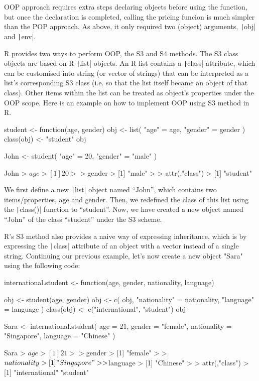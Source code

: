 OOP approach requires extra steps declaring objects before using the function, but once the declaration is completed, calling the pricing funcion is much simpler than the POP approach. As above, it only required two (object) arguments, \texttt|obj| and \texttt|env|.

R provides two ways to perform OOP, the S3 and S4 methods. The S3 class objects are based on R \texttt|list| objects. An R list contains a \texttt|class| attribute, which can be customised into string (or vector of strings) that can be interpreted as a list's corresponding S3 class (i.e. so that the list itself became an object of that class). Other items within the list can be treated as object's properties under the OOP scope. Here is an example on how to implement OOP using S3 method in R.

\begin{Rminted}
student <- function(age, gender) {
    obj <- list(
        "age" = age,
        "gender" = gender
    )
    class(obj) <- "student"
    obj
}

John <- student(
    "age" = 20,
    "gender" = "male"
)

John
> $age
> [1] 20
> 
> $gender
> [1] "male"
> 
> attr(,"class")
> [1] "student"
\end{Rminted}

We first define a new \texttt|list| object named ``John'', which contains two items/properties, age and gender. Then, we redefined the class of this list using the \texttt|class()| function to ``student''. Now, we have created a new object named ``John'' of the class ``student'' under the S3 scheme.

R's S3 method also provides a naive way of expressing inheritance, which is by expressing the \texttt|class| attribute of an object with a vector instead of a single string. Continuing our previous example, let's now create a new object "Sara" using the following code:

\begin{Rminted}
international.student <- function(age, gender, nationality, language) {
    
    obj <- student(age, gender)
    obj <- c(
        obj,
        "nationality" = nationality,
        "language" = language
    )
    class(obj) <- c("international", "student")
    obj
}

Sara <- international.student(
    age = 21,
    gender = "female",
    nationality = "Singapore",
    language = "Chinese"
)

Sara
> $age
> [1] 21
> 
> $gender
> [1] "female"
> 
> $nationality
> [1] "Singapore"
> 
> $language
> [1] "Chinese"
> 
> attr(,"class")
> [1] "international" "student"    
\end{Rminted}

